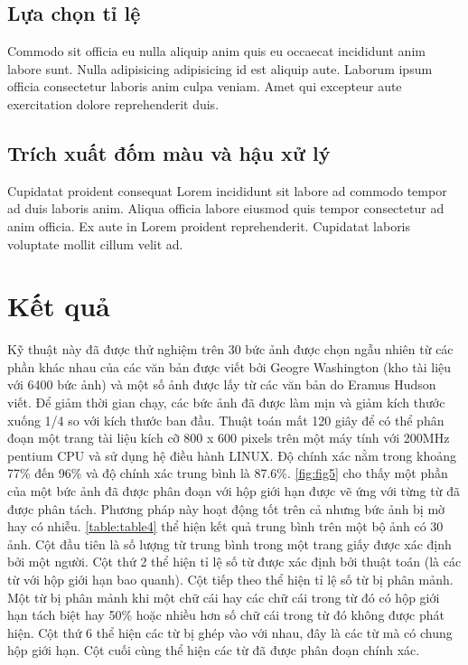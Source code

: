 \documentclass[a4paper]{article}
\begin{document}
\subsection{Lựa chọn tỉ lệ}
Commodo sit officia eu nulla aliquip anim quis eu occaecat incididunt anim labore sunt. Nulla adipisicing adipisicing id est aliquip aute. Laborum ipsum officia consectetur laboris anim culpa veniam. Amet qui excepteur aute exercitation dolore reprehenderit duis.

\subsection{Trích xuất đốm màu và hậu xử lý}
Cupidatat proident consequat Lorem incididunt sit labore ad commodo tempor ad duis laboris anim. Aliqua officia labore eiusmod quis tempor consectetur ad anim officia. Ex aute in Lorem proident reprehenderit. Cupidatat laboris voluptate mollit cillum velit ad.

\section{Kết quả}
Kỹ thuật này đã được thử nghiệm trên 30 bức ảnh được chọn ngẫu nhiên từ các phần khác nhau của các văn bản được viết bởi Geogre Washington (kho tài liệu với 6400 bức ảnh) và một số ảnh được lấy từ các văn bản do Eramus Hudson viết. Để giảm thời gian chạy, các bức ảnh đã được làm mịn và giảm kích thước xuống 1/4 so với kích thước ban đầu. Thuật toán mất 120 giây để có thể phân đoạn một trang tài liệu kích cỡ 800 x 600 pixels trên một máy tính với 200MHz pentium CPU và sử dụng hệ điều hành LINUX. Độ chính xác nằm trong khoảng 77\% đến 96\% và độ chính xác trung bình là 87.6\%. \ref{fig:fig5} cho thấy một phần của một bức ảnh đã được phân đoạn với hộp giới hạn được vẽ ứng với từng từ đã được phân tách. Phương pháp này hoạt động tốt trên cả nhưng bức ảnh bị mờ hay có nhiễu. \ref{table:table4} thể hiện kết quả trung bình trên một bộ ảnh có 30 ảnh. Cột đầu tiên là số lượng từ trung bình trong một trang giấy được xác định bởi một người. Cột thứ 2 thể hiện tỉ lệ số từ được xác định bởi thuật toán (là các từ với hộp giới hạn bao quanh). Cột tiếp theo thể hiện tỉ lệ số từ bị phân mảnh. Một từ bị phân mảnh khi một chữ cái hay các chữ cái trong từ đó có hộp giới hạn tách biệt hay 50\% hoặc nhiều hơn số chữ cái trong từ đó không được phát hiện. Cột thứ 6 thể hiện các từ bị ghép vào với nhau, đây là các từ mà có chung hộp giới hạn. Cột cuối cùng thể hiện các từ đã được phân đoạn chính xác.
\end{document}
